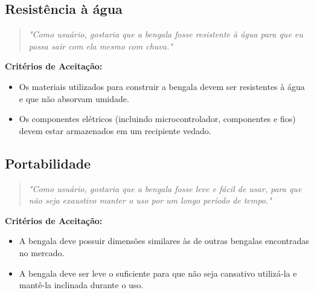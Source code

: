     \subsection{Resistência à água}
    \begin{quote}
    \textit{"Como usuário, gostaria que a bengala fosse resistente à água para que eu possa sair com ela mesmo com chuva."}
    \end{quote}    
    \noindent\textbf{Critérios de Aceitação:}
    \begin{itemize}
        \item Os materiais utilizados para construir a bengala devem ser resistentes à água e que não absorvam umidade.
        \item Os componentes elétricos (incluindo microcontrolador, componentes e fios) devem estar armazenados em um recipiente vedado.
    \end{itemize}
        
    \subsection{Portabilidade}
    \begin{quote}
    \textit{"Como usuário, gostaria que a bengala fosse leve e fácil de usar, para que não seja exaustivo manter o uso por um longo período de tempo."}
    \end{quote}    
    \noindent\textbf{Critérios de Aceitação:}
    \begin{itemize}
        \item A bengala deve possuir dimensões similares às de outras bengalas encontradas no mercado.
        \item A bengala deve ser leve o suficiente para que não seja cansativo utilizá-la e mantê-la inclinada durante o uso.
    \end{itemize}
                
